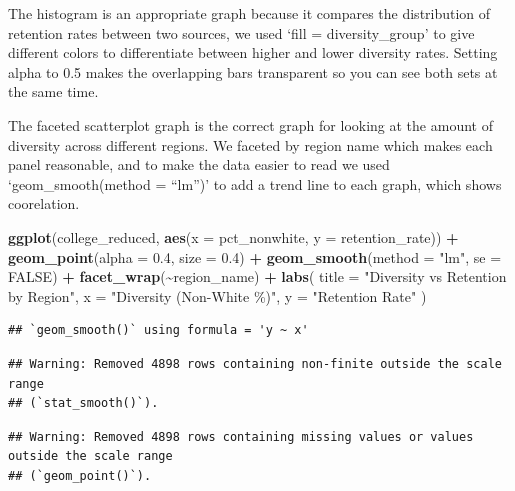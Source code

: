 \documentclass[
]{article}
\newenvironment{Shaded}{\begin{snugshade}}{\end{snugshade}}
\newcommand{\AttributeTok}[1]{\textcolor[rgb]{0.13,0.29,0.53}{#1}}
\newcommand{\ConstantTok}[1]{\textcolor[rgb]{0.56,0.35,0.01}{#1}}
\newcommand{\FloatTok}[1]{\textcolor[rgb]{0.00,0.00,0.81}{#1}}
\newcommand{\FunctionTok}[1]{\textcolor[rgb]{0.13,0.29,0.53}{\textbf{#1}}}
\newcommand{\NormalTok}[1]{#1}
\newcommand{\SpecialCharTok}[1]{\textcolor[rgb]{0.81,0.36,0.00}{\textbf{#1}}}
\newcommand{\StringTok}[1]{\textcolor[rgb]{0.31,0.60,0.02}{#1}}
\begin{document}
The histogram is an appropriate graph because it compares the
distribution of retention rates between two sources, we used `fill =
diversity\_group' to give different colors to differentiate between
higher and lower diversity rates. Setting alpha to 0.5 makes the
overlapping bars transparent so you can see both sets at the same time.

The faceted scatterplot graph is the correct graph for looking at the
amount of diversity across different regions. We faceted by region name
which makes each panel reasonable, and to make the data easier to read
we used `geom\_smooth(method = ``lm'')' to add a trend line to each
graph, which shows coorelation.

\begin{Shaded}
\begin{Highlighting}[]
\FunctionTok{ggplot}\NormalTok{(college\_reduced, }\FunctionTok{aes}\NormalTok{(}\AttributeTok{x =}\NormalTok{ pct\_nonwhite, }\AttributeTok{y =}\NormalTok{ retention\_rate)) }\SpecialCharTok{+}
  \FunctionTok{geom\_point}\NormalTok{(}\AttributeTok{alpha =} \FloatTok{0.4}\NormalTok{, }\AttributeTok{size =} \FloatTok{0.4}\NormalTok{) }\SpecialCharTok{+}
  \FunctionTok{geom\_smooth}\NormalTok{(}\AttributeTok{method =} \StringTok{"lm"}\NormalTok{, }\AttributeTok{se =} \ConstantTok{FALSE}\NormalTok{) }\SpecialCharTok{+}
  \FunctionTok{facet\_wrap}\NormalTok{(}\SpecialCharTok{\textasciitilde{}}\NormalTok{region\_name) }\SpecialCharTok{+}
  \FunctionTok{labs}\NormalTok{(}
    \AttributeTok{title =} \StringTok{"Diversity vs Retention by Region"}\NormalTok{,}
    \AttributeTok{x =} \StringTok{"Diversity (Non{-}White \%)"}\NormalTok{,}
    \AttributeTok{y =} \StringTok{"Retention Rate"}
\NormalTok{  )}
\end{Highlighting}
\end{Shaded}

\begin{verbatim}
## `geom_smooth()` using formula = 'y ~ x'
\end{verbatim}

\begin{verbatim}
## Warning: Removed 4898 rows containing non-finite outside the scale range
## (`stat_smooth()`).
\end{verbatim}

\begin{verbatim}
## Warning: Removed 4898 rows containing missing values or values outside the scale range
## (`geom_point()`).
\end{verbatim}
\end{document}
